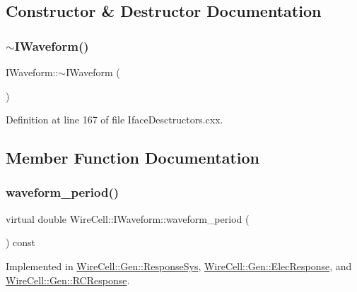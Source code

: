 \subsection{Constructor \& Destructor Documentation}
\mbox{\label{class_wire_cell_1_1_i_waveform_ab4787e8ab17e3d205b490dc29b2192ef}} 
\subsubsection{\texorpdfstring{$\sim$\+I\+Waveform()}{~IWaveform()}}
{\footnotesize\ttfamily I\+Waveform\+::$\sim$\+I\+Waveform (\begin{DoxyParamCaption}{ }\end{DoxyParamCaption})\hspace{0.3cm}{\ttfamily [virtual]}}



Definition at line 167 of file Iface\+Desctructors.\+cxx.



\subsection{Member Function Documentation}
\mbox{\label{class_wire_cell_1_1_i_waveform_a0d5d0cd99b8a4e49d5d8b633150b707a}} 
\subsubsection{\texorpdfstring{waveform\+\_\+period()}{waveform\_period()}}
{\footnotesize\ttfamily virtual double Wire\+Cell\+::\+I\+Waveform\+::waveform\+\_\+period (\begin{DoxyParamCaption}{ }\end{DoxyParamCaption}) const\hspace{0.3cm}{\ttfamily [pure virtual]}}



Implemented in \hyperlink{class_wire_cell_1_1_gen_1_1_response_sys_ab6bced35ba8f8279d8204d842caf868a}{Wire\+Cell\+::\+Gen\+::\+Response\+Sys}, \hyperlink{class_wire_cell_1_1_gen_1_1_elec_response_a7e2061fe4702e667aecb29427383a5ce}{Wire\+Cell\+::\+Gen\+::\+Elec\+Response}, and \hyperlink{class_wire_cell_1_1_gen_1_1_r_c_response_a866c57fca71207b5d32b8e68b467a965}{Wire\+Cell\+::\+Gen\+::\+R\+C\+Response}.


